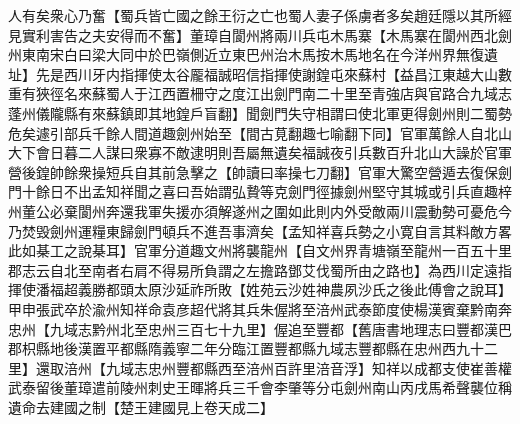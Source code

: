 人有矣衆心乃奮【蜀兵皆亡國之餘王衍之亡也蜀人妻子係虜者多矣趙廷隱以其所經見實利害告之夫安得而不奮】董璋自閬州將兩川兵屯木馬寨【木馬寨在閬州西北劍州東南宋白曰梁大同中於巴嶺側近立東巴州治木馬按木馬地名在今洋州界無復遺址】先是西川牙内指揮使太谷龎福誠昭信指揮使謝鍠屯來蘇村【益昌江東越大山數重有狹徑名來蘇蜀人于江西置柵守之度江出劍門南二十里至青強店與官路合九域志蓬州儀隴縣有來蘇鎮即其地鍠戶盲翻】聞劍門失守相謂曰使北軍更得劍州則二蜀勢危矣遽引部兵千餘人間道趣劍州始至【間古莧翻趣七喻翻下同】官軍萬餘人自北山大下會日暮二人謀曰衆寡不敵逮明則吾屬無遺矣福誠夜引兵數百升北山大譟於官軍營後鍠帥餘衆操短兵自其前急擊之【帥讀曰率操七刀翻】官軍大驚空營遁去復保劍門十餘日不出孟知祥聞之喜曰吾始謂弘贄等克劍門徑據劍州堅守其城或引兵直趣梓州董公必棄閬州奔還我軍失援亦須解遂州之圍如此則内外受敵兩川震動勢可憂危今乃焚毁劍州運糧東歸劍門頓兵不進吾事濟矣【孟知祥喜兵勢之小寛自言其料敵方畧此如棊工之說棊耳】官軍分道趣文州將襲龍州【自文州界青塘嶺至龍州一百五十里郡志云自北至南者右肩不得易所負謂之左擔路鄧艾伐蜀所由之路也】為西川定遠指揮使潘福超義勝都頭太原沙延祚所敗【姓苑云沙姓神農夙沙氏之後此傅會之說耳】甲申張武卒於渝州知祥命袁彦超代將其兵朱偓將至涪州武泰節度使楊漢賓棄黔南奔忠州【九域志黔州北至忠州三百七十九里】偓追至豐都【舊唐書地理志曰豐都漢巴郡枳縣地後漢置平都縣隋義寧二年分臨江置豐都縣九域志豐都縣在忠州西九十二里】還取涪州【九域志忠州豐都縣西至涪州百許里涪音浮】知祥以成都支使崔善權武泰留後董璋遣前陵州刺史王暉將兵三千會李肇等分屯劍州南山丙戌馬希聲襲位稱遺命去建國之制【楚王建國見上卷天成二】

